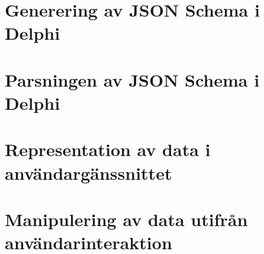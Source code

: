 \section{Generering av JSON Schema i Delphi}


\section{Parsningen av JSON Schema i Delphi}


\section{Representation av data i användargänssnittet}


\section{Manipulering av data utifrån användarinteraktion}
